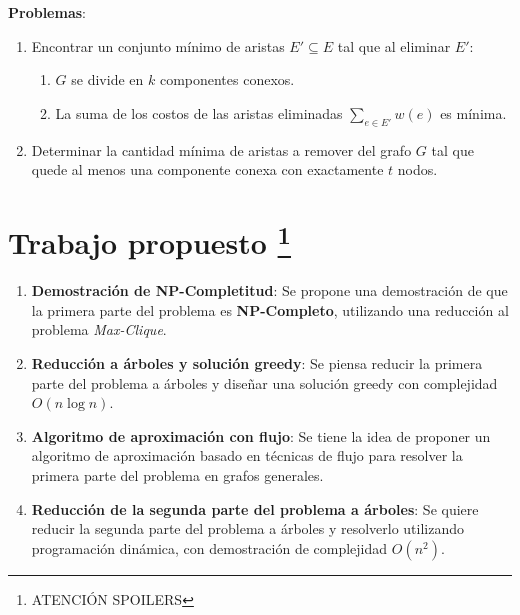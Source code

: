 \documentclass[a4paper, 12pt]{article}
\begin{document}
\noindent \textbf{Problemas}:
\begin{enumerate}
    \item Encontrar un conjunto mínimo de aristas \( E' \subseteq E \) tal que al eliminar \( E' \):
    \begin{enumerate}
        \item \( G \) se divide en \( k \) componentes conexos.
        \item La suma de los costos de las aristas eliminadas \( \sum_{e \in E'} w(e) \) es mínima.
    \end{enumerate}
    \item Determinar la cantidad mínima de aristas a remover del grafo \( G \) tal que quede al menos una componente conexa con exactamente \( t \) nodos.
\end{enumerate}

\section*{Trabajo propuesto \footnote{ATENCIÓN SPOILERS}}
\begin{enumerate}
    \item \textbf{Demostración de NP-Completitud}: 
    Se propone una demostración de que la primera parte del problema es \textbf{NP-Completo}, utilizando una reducción al problema \textit{Max-Clique}.
    \item \textbf{Reducción a árboles y solución greedy}: 
    Se piensa reducir la primera parte del problema a árboles y diseñar una solución greedy con complejidad \( O(n \log n) \).
    \item \textbf{Algoritmo de aproximación con flujo}: 
    Se tiene la idea de proponer un algoritmo de aproximación basado en técnicas de flujo para resolver la primera parte del problema en grafos generales.
    \item \textbf{Reducción de la segunda parte del problema a árboles}: 
    Se quiere reducir la segunda parte del problema a árboles y resolverlo utilizando programación dinámica, con demostración de complejidad \( O(n^2) \).
\end{enumerate}
\end{document}
